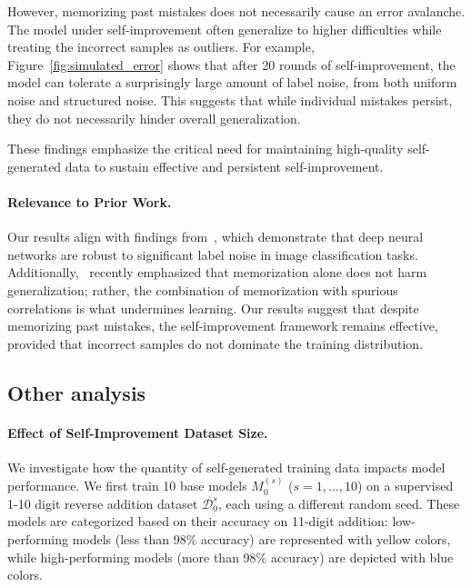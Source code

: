 However, memorizing past mistakes does not necessarily cause an error avalanche. The model under self-improvement often generalize to higher difficulties while treating the incorrect samples as outliers. For example, Figure~\ref{fig:simulated_error} shows that after 20 rounds of self-improvement, the model can tolerate a surprisingly large amount of label noise, from both uniform noise and structured noise. This suggests that while individual mistakes persist, they do not necessarily hinder overall generalization.


These findings emphasize the critical need for maintaining high-quality self-generated data to sustain effective and persistent self-improvement.


\paragraph{Relevance to Prior Work. }
Our results align with findings from~\citet{rolnick2017deep}, which demonstrate that deep neural networks are robust to significant label noise in image classification tasks. Additionally,~\citet{Bayat2024ThePO} recently emphasized that memorization alone does not harm generalization; rather, the combination of memorization with spurious correlations is what undermines learning. Our results suggest that despite memorizing past mistakes, the self-improvement framework remains effective, provided that incorrect samples do not dominate the training distribution.


























\subsection{Other analysis}\label{sec:si_data_size}

\paragraph{Effect of Self-Improvement Dataset Size. }
We investigate how the quantity of self-generated training data impacts model performance. We first train 10 base models \( M_0^{(s)} \) (\( s=1, \dots, 10 \)) on a supervised 1-10 digit reverse addition dataset \( \mathcal{D}_0^s \), each using a different random seed. These models are categorized based on their accuracy on 11-digit addition: low-performing models (less than 98\% accuracy) are represented with yellow colors, while high-performing models (more than 98\% accuracy) are depicted with blue colors. 

